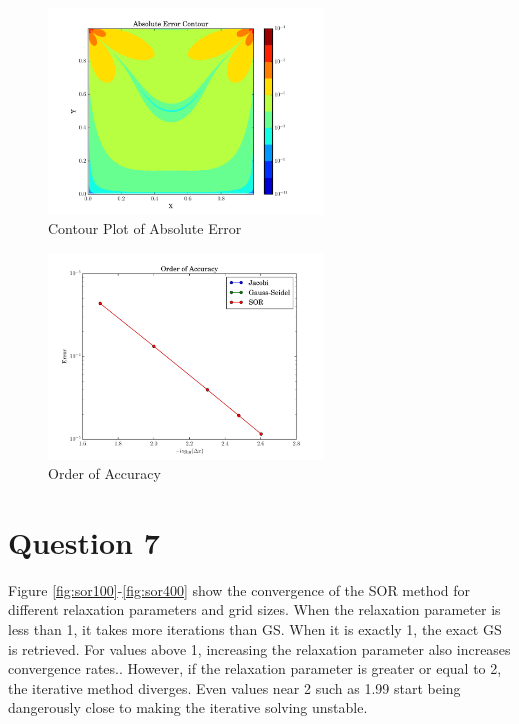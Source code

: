 \documentclass[letterpaper,12pt,]{article}
\begin{document}
\begin{figure}[!h]
    \centering
    \includegraphics[width = 0.65\textwidth]{./Figures/ErrorContour.pdf}
    \caption{Contour Plot of Absolute Error}
    \label{fig:errorc}
\end{figure}

\begin{figure}[!h]
    \centering
    \includegraphics[width = 0.65\textwidth]{./Figures/Error.pdf}
    \caption{Order of Accuracy}
    \label{fig:error}
\end{figure}


\section*{Question 7}

Figure \ref{fig:sor100}-\ref{fig:sor400} show the convergence of the SOR method for different relaxation parameters and grid sizes.
When the relaxation parameter is less than 1, it takes more iterations than GS.
When it is exactly 1, the exact GS is retrieved.
For values above 1, increasing the relaxation parameter also increases convergence rates..
However, if the relaxation parameter is greater or equal to 2, the iterative method diverges.
Even values near 2 such as 1.99 start being dangerously close to making the iterative solving unstable.
\end{document}
